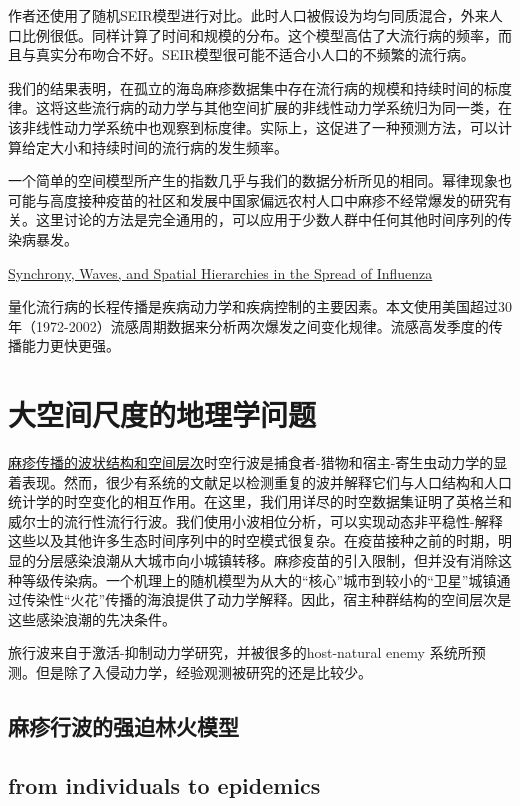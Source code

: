 作者还使用了随机SEIR模型进行对比。此时人口被假设为均匀同质混合，外来人口比例很低。同样计算了时间和规模的分布。这个模型高估了大流行病的频率，而且与真实分布吻合不好。SEIR模型很可能不适合小人口的不频繁的流行病。

我们的结果表明，在孤立的海岛麻疹数据集中存在流行病的规模和持续时间的标度律。这将这些流行病的动力学与其他空间扩展的非线性动力学系统归为同一类，在该非线性动力学系统中也观察到标度律。实际上，这促进了一种预测方法，可以计算给定大小和持续时间的流行病的发生频率。

一个简单的空间模型所产生的指数几乎与我们的数据分析所见的相同。幂律现象也可能与高度接种疫苗的社区和发展中国家偏远农村人口中麻疹不经常爆发的研究有关。这里讨论的方法是完全通用的，可以应用于少数人群中任何其他时间序列的传染病暴发。
    
\href{https://science.sciencemag.org/content/sci/312/5772/447.full.pdf}{Synchrony, Waves, and Spatial Hierarchies in the Spread of Influenza}

量化流行病的长程传播是疾病动力学和疾病控制的主要因素。本文使用美国超过30年（1972-2002）流感周期数据来分析两次爆发之间变化规律。流感高发季度的传播能力更快更强。



\section{大空间尺度的地理学问题}

\href{https://www.nature.com/articles/414716a.pdf}{麻疹传播的波状结构和空间层次}时空行波是捕食者-猎物和宿主-寄生虫动力学的显着表现。然而，很少有系统的文献足以检测重复的波并解释它们与人口结构和人口统计学的时空变化的相互作用。在这里，我们用详尽的时空数据集证明了英格兰和威尔士的流行性流行行波。我们使用小波相位分析，可以实现动态非平稳性-解释这些以及其他许多生态时间序列中的时空模式很复杂。在疫苗接种之前的时期，明显的分层感染浪潮从大城市向小城镇转移。麻疹疫苗的引入限制，但并没有消除这种等级传染病。一个机理上的随机模型为从大的“核心”城市到较小的“卫星”城镇通过传染性“火花”传播的海浪提供了动力学解释。因此，宿主种群结构的空间层次是这些感染浪潮的先决条件。

旅行波来自于激活-抑制动力学研究，并被很多的host-natural enemy 系统所预测。但是除了入侵动力学，经验观测被研究的还是比较少。

\subsection{麻疹行波的强迫林火模型}



\subsection{from individuals to epidemics}